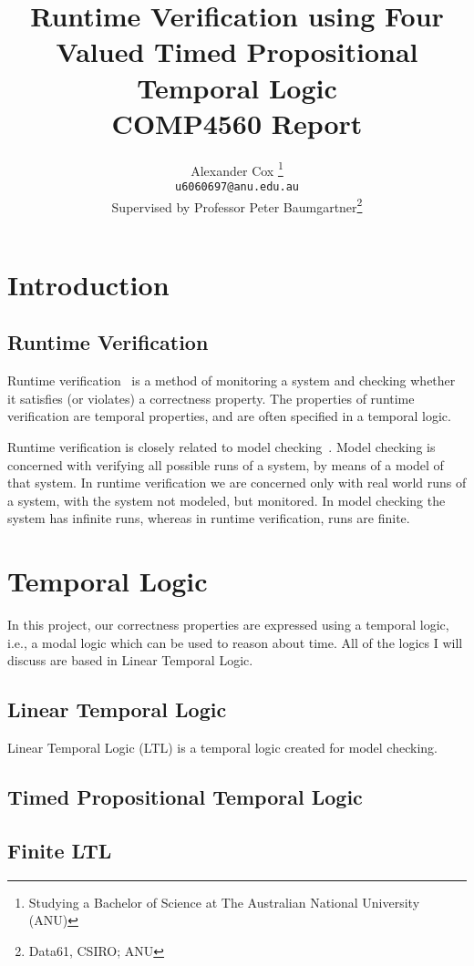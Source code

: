 \documentclass[a4paper]{article}
\title{
  Runtime Verification using Four Valued Timed Propositional Temporal Logic\\
  \normalsize{} COMP4560 Report
}
\author{
  Alexander Cox
  \thanks{Studying a Bachelor of Science at The Australian National University (ANU)}\\
  \small\texttt{u6060697@anu.edu.au}\\
  \normalsize{}Supervised by Professor Peter Baumgartner\thanks{Data61, CSIRO\@; ANU}
}
\begin{document}
\maketitle

\begin{abstract}
\end{abstract}
\section{Introduction}
\subsection{Runtime Verification}
Runtime verification~\autocite{colin2005rv} is a method of monitoring a system and checking whether it satisfies (or violates) a correctness property.
The properties of runtime verification are temporal properties, and are often specified in a temporal logic. %

Runtime verification is closely related to model checking~\autocite{baier2008principles}. Model checking is concerned with verifying all possible runs of a system, by means of a model of that system. In runtime verification we are concerned only with real world runs of a system, with the system not modeled, but monitored. In model checking the system has infinite runs, whereas in runtime verification, runs are finite.

\section{Temporal Logic}
In this project, our correctness properties are expressed using a temporal logic, i.e., a modal logic which can be used to reason about time. All of the logics I will discuss are based in Linear Temporal Logic.

\subsection{Linear Temporal Logic}
Linear Temporal Logic (LTL)\autocite{pnueli1977temporal} is a temporal logic created for model checking.

\subsection{Timed Propositional Temporal Logic}
\subsection{Finite LTL}
\end{document}
